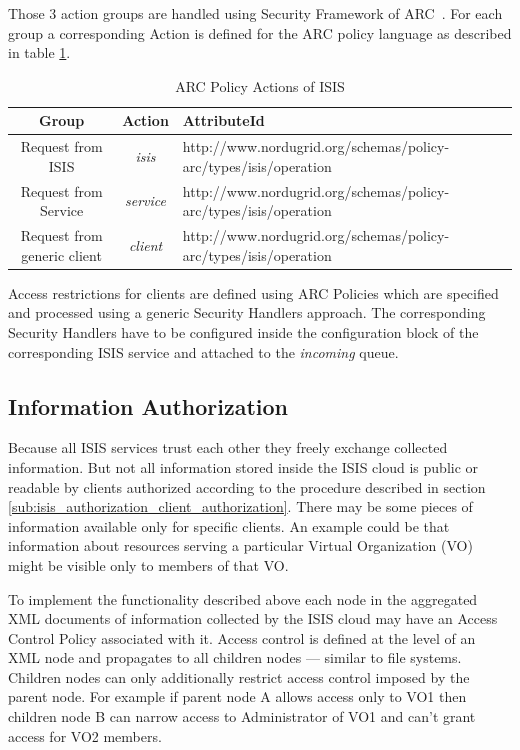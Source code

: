 \documentclass{book}
\begin{document}
Those 3 action groups are handled using Security Framework of ARC~\cite{arcsec}. For each group a corresponding
Action is defined for the ARC policy language as described in table \ref{tab:policy_actions}.

\begin{table}[h]
\caption{ARC Policy Actions of ISIS}
\label{tab:policy_actions}
\begin{tabular}{|c|c|l|}
\hline
\textbf{Group}&\textbf{Action}&\textbf{AttributeId}\\
\hline
Request from ISIS&\textit{isis}&http://www.nordugrid.org/schemas/policy-arc/types/isis/operation\\
\hline
Request from Service&\textit{service}&http://www.nordugrid.org/schemas/policy-arc/types/isis/operation\\
\hline
Request from generic client&\textit{client}&http://www.nordugrid.org/schemas/policy-arc/types/isis/operation\\
\hline
\end{tabular}
\end{table}

Access restrictions for clients are defined using ARC Policies which are specified and 
processed using a generic Security Handlers approach. The corresponding Security Handlers have to be 
configured inside the configuration block of the corresponding ISIS service and attached to the
\textit{incoming} queue.



\subsection{Information Authorization}
\label{sub:isis_authorization_information_authorization}

Because all ISIS services trust each other they freely exchange collected information. But 
not all information stored inside the ISIS cloud is public or readable by clients authorized according 
to the procedure described in section \ref{sub:isis_authorization_client_authorization}. There
may be some pieces of information available only for specific clients. An example could be that
information about resources serving a particular Virtual Organization (VO) might be visible only to
members of that VO.

To implement the functionality described above each node in the aggregated XML documents of information
collected by the ISIS cloud may have an Access Control Policy associated with it. Access control is 
defined at the level of an XML node and propagates to all children nodes --- similar to file systems.
Children nodes can only additionally restrict access control imposed by the parent node. For example
if parent node A allows access only to VO1 then children node B can narrow access to Administrator 
of VO1 and can't grant access for VO2 members.
\end{document}
